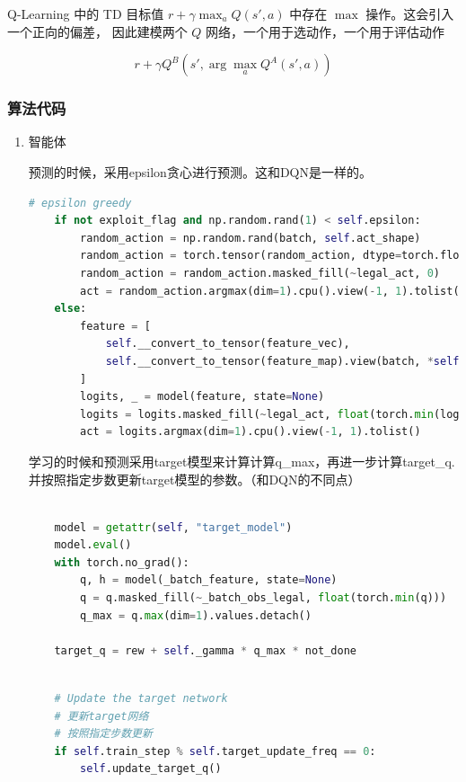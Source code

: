 Q-Learning 中的 TD 目标值 $r + \gamma \max_{a} Q(s', a)$ 中存在 $\max$ 操作。这会引入一个正向的偏差，
因此建模两个 $Q$ 网络，一个用于选动作，一个用于评估动作

\[
r + \gamma Q^B \left( s', \arg \max_{a} Q^A(s',a) \right)
\]


\subsubsection{算法代码}

\begin{enumerate}
    
\item 智能体

预测的时候，采用epsilon贪心进行预测。这和DQN是一样的。

\begin{lstlisting}[language=Python]
    # epsilon greedy
    if not exploit_flag and np.random.rand(1) < self.epsilon:
        random_action = np.random.rand(batch, self.act_shape)
        random_action = torch.tensor(random_action, dtype=torch.float32).to(self.device)
        random_action = random_action.masked_fill(~legal_act, 0)
        act = random_action.argmax(dim=1).cpu().view(-1, 1).tolist()
    else:
        feature = [
            self.__convert_to_tensor(feature_vec),
            self.__convert_to_tensor(feature_map).view(batch, *self.obs_split[1]),
        ]
        logits, _ = model(feature, state=None)
        logits = logits.masked_fill(~legal_act, float(torch.min(logits)))
        act = logits.argmax(dim=1).cpu().view(-1, 1).tolist()
\end{lstlisting}

学习的时候和预测采用target模型来计算计算q\_max，再进一步计算target\_q.并按照指定步数更新target模型的参数。（和DQN的不同点）
\begin{lstlisting}[language=Python]

    model = getattr(self, "target_model")
    model.eval()
    with torch.no_grad():
        q, h = model(_batch_feature, state=None)
        q = q.masked_fill(~_batch_obs_legal, float(torch.min(q)))
        q_max = q.max(dim=1).values.detach()

    target_q = rew + self._gamma * q_max * not_done
\end{lstlisting}

\begin{lstlisting}[language=Python]

    # Update the target network
    # 更新target网络
    # 按照指定步数更新
    if self.train_step % self.target_update_freq == 0:
        self.update_target_q()
\end{lstlisting}


\end{enumerate}
